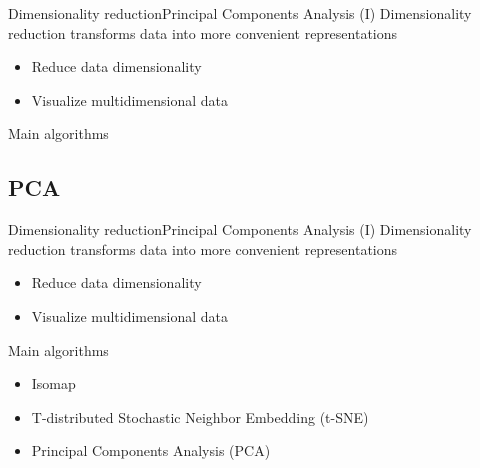 \documentclass[10pt,compress]{beamer} %
\begin{document}
\begin{frame}{Dimensionality reduction}{Principal Components Analysis (I)}
	Dimensionality reduction transforms data into more convenient representations
	\begin{itemize}
		\item Reduce data dimensionality
		\item Visualize multidimensional data
	\end{itemize}

	Main algorithms

\end{frame}


\subsection{PCA}

\begin{frame}{Dimensionality reduction}{Principal Components Analysis (I)}
	Dimensionality reduction transforms data into more convenient representations
	\begin{itemize}
		\item Reduce data dimensionality
		\item Visualize multidimensional data
	\end{itemize}

	Main algorithms
	\begin{itemize}
		\item Isomap
		\item T-distributed Stochastic Neighbor Embedding (t-SNE)
		\item Principal Components Analysis (PCA)
	\end{itemize}

\end{frame}
\end{document}
